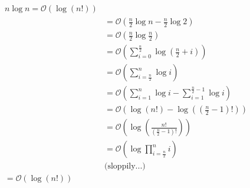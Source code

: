 \documentclass{article}
\begin{document}
\begin{align*}
    n \log n = \mathcal{O}(\log(n!)) \\
    &= \mathcal{O} \left(\frac{n}{2} \log n - \frac{n}{2} \log 2 \right) \\
    &= \mathcal{O} \left(\frac{n}{2} \log \frac{n}{2} \right) \\
    &= \mathcal{O} \left(\sum_{i = 0}^{\frac{n}{2}} \log \left(\frac{n}{2} + i\right) \right) \\
    &= \mathcal{O} \left(\sum_{i = \frac{n}{2}}^{n} \log i \right) \\
    &= \mathcal{O} \left(\sum_{i = 1}^{n} \log i - \sum_{i = 1}^{\frac{n}{2} - 1} \log i \right) \\
    &= \mathcal{O} \left(\log(n!) - \log \left(\left(\frac{n}{2} - 1\right)! \right) \right) \\
    &= \mathcal{O} \left(\log \left(\frac{n!}{(\frac{n}{2} - 1)!} \right) \right) \\
    &= \mathcal{O} \left(\log \prod_{i = \frac{n}{2}}^{n} i \right) \\
    &\text{(sloppily...)} \\
    = \mathcal{O}(\log(n!))
\end{align*}
\end{document}
